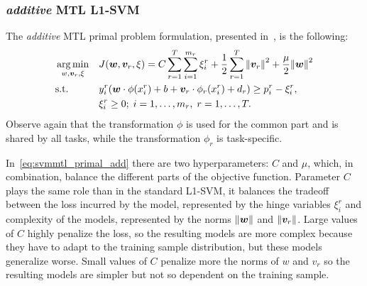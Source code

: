 \subsubsection{\emph{additive} MTL L1-SVM}
The \emph{additive} MTL primal problem formulation, presented in~\cite{EvgeniouP04}, is the following:
\begin{equation}\label{eq:svmmtl_primal_add}
    \begin{aligned}
    & \argmin_{w, \fv{v}_r, \xi}
    & & {J(\fv{w}, \fv{v}_r, \xi) = C \sum_{r= 1}^T \sum_{i=1}^{m_r} {\xi_{i}^r} + \frac{1}{2} \sum_{r= 1}^T{\norm{\fv{v}_r}^2} + \frac{\mu}{2} {\norm{\fv{w}}}^2} \\
    & \text{s.t.}
    & & y_{i}^r (\fv{w} \cdot \phi(x_{i}^r) + b + \fv{v}_r \cdot \phi_r(x_{i}^r) + d_r) \geq p_{i}^r - \xi_{i}^r ,  \\
    & & & \xi_{i}^r \geq 0; \;  i=1 , \dotsc , m_r, \;  r= 1,\dotsc, T  . \\
    \end{aligned}
\end{equation}
Observe again that the transformation $\phi$ is used for the common part and is shared by all tasks, while the transformation $\phi_r$ is task-specific.

%
In~\eqref{eq:svmmtl_primal_add} there are two hyperparameters: $C$ and $\mu$, which, in combination, balance the different parts of the objective function. 
%
Parameter $C$ plays the same role than in the standard L1-SVM, it balances the tradeoff between the loss incurred by the model, represented by the hinge variables $\xi_i^r$ and complexity of the models, represented by the norms $\left\lVert\bm{w}\right\rVert$ and $\left\lVert\bm{v}_r\right\rVert$. Large values of $C$ highly penalize the loss, so the resulting models are more complex because they have to adapt to the training sample distribution, but these models generalize worse. Small values of $C$ penalize more the norms of $w$ and $v_r$ so the resulting models are simpler but not so dependent on the training sample.

